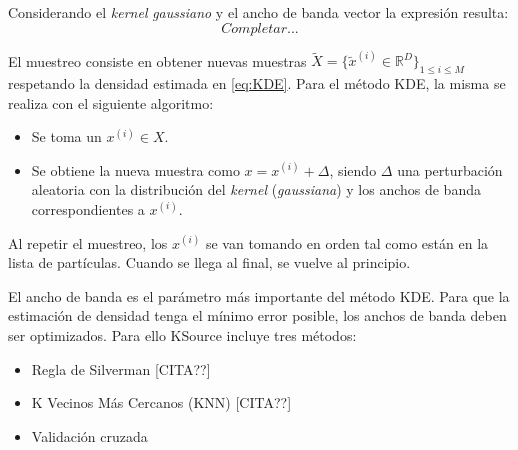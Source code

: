 Considerando el \emph{kernel} \emph{gaussiano} y el ancho de banda vector la expresión resulta:
\begin{equation}
    Completar...
\end{equation}

El muestreo consiste en obtener nuevas muestras $\tilde{X} = \{\tilde{x}^{(i)} \in \mathbb{R}^D\}_{1\leq i \leq M}$ respetando la densidad estimada en \ref{eq:KDE}. Para el método KDE, la misma se realiza con el siguiente algoritmo:
\begin{itemize}
    \item Se toma un $x^{(i)} \in X$.
    \item Se obtiene la nueva muestra como $x = x^{(i)} + \Delta$, siendo $\Delta$ una perturbación aleatoria con la distribución del \emph{kernel} (\emph{gaussiana}) y los anchos de banda correspondientes a $x^{(i)}$.
\end{itemize}
Al repetir el muestreo, los $x^{(i)}$ se van tomando en orden tal como están en la lista de partículas. Cuando se llega al final, se vuelve al principio.

El ancho de banda es el parámetro más importante del método KDE. Para que la estimación de densidad tenga el mínimo error posible, los anchos de banda deben ser optimizados. Para ello KSource incluye tres métodos:
\begin{itemize}
    \item Regla de Silverman [CITA??]
    \item K Vecinos Más Cercanos (KNN) [CITA??]
    \item Validación cruzada
\end{itemize}